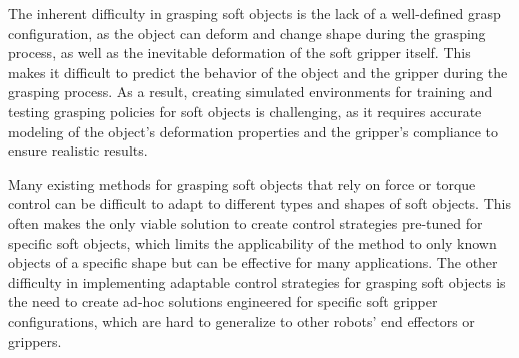 The inherent difficulty in grasping soft objects is the lack of a well-defined grasp
configuration, as the object can deform and change shape during the grasping process,
as well as the inevitable deformation of the soft gripper itself. This makes it difficult
to predict the behavior of the object and the gripper during the grasping process.
As a result, creating simulated environments for training and testing grasping policies
for soft objects is challenging, as it requires accurate modeling of the object's
deformation properties and the gripper's compliance to ensure realistic results.

Many existing methods for grasping soft objects that rely on force or torque control
can be difficult to adapt to different types and shapes of soft objects. 
This often makes the only viable solution
to create control strategies pre-tuned for specific soft objects, which limits the
applicability of the method to only known objects of a specific shape but can be effective for
many applications. The other difficulty in implementing adaptable control strategies
for grasping soft objects is the need to create ad-hoc solutions engineered for
specific soft gripper configurations, which are hard to generalize to other robots' end effectors
or grippers.


